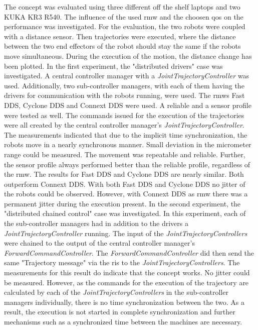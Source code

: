 The concept was evaluated using three different off the shelf laptops and two KUKA KR3 R540. The influence of the used \gls{rmw} and the choosen \gls{qos} on the performance was investigated. For the evaluation, the two robots were coupled with a distance sensor. Then trajectories were executed, where the distance between the two end effectors of the robot should stay the same if the robots move simultaneous. During the execution of the motion, the distance change has been plotted.\newline
In the first experiment, the "distributed drivers" case was investigated. A central controller manager with a \textit{JointTrajectoryController} was used. Additionally, two sub-controller managers, with each of them having the drivers for communication with the robots running, were used. The \glspl{rmw} Fast DDS, Cyclone DDS and Connext DDS were used. A reliable and a sensor profile were tested as well. The commands issued for the execution of the trajectories were all created by the central controller manager's \textit{JointTrajectoryController}. The measurements indicated that due to the implicit time synchronization, the robots move in a nearly synchronous manner. Small deviation in the micrometer range could be measured. The movement was repeatable and reliable. Further, the sensor profile always performed better than the reliable profile, regardless of the \gls{rmw}. The results for Fast DDS and Cyclone DDS are nearly similar. Both outperform Connext DDS. With both Fast DDS and Cyclone DDS no jitter of the robots could be observed. However, with Connext DDS as \gls{rmw} there was a permanent jitter during the execution present.\newline
In the second experiment, the "distributed chained control" case was investigated. In this experiment, each of the sub-controller managers had in addition to the drivers a \textit{JointTrajectoryController} running. The input of the \textit{JointTrajectoryControllers} were chained to the output of the central controller manager's \textit{ForwardCommandController}. The \textit{ForwardCommandController} did then send the same  "Trajectory message" via the \glspl{ri} to the \textit{JointTrajectoryControllers}. The measurements for this result do indicate that the concept works. No jitter could be measured. However, as the commands for the execution of the trajectory are calculated by each of the \textit{JointTrajectoryControllers} in the sub-controller managers individually, there is no time synchronization between the two. As a result, the execution is not started in complete synchronization and further mechanisms such as a synchronized time between the machines are necessary.

